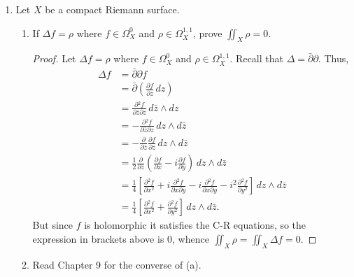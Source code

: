 \documentclass[11pt,oneside,english,reqno]{amsart}
\theoremstyle{definition}
\newcommand{\pp}[2]{\frac{\partial{#1}}{\partial{#2}}}
\begin{document}
\begin{enumerate}[leftmargin=*]
\pagebreak

\item Let $X$ be a compact Riemann surface.
\begin{enumerate}
\itemsep5mm
\item If $\Delta f=\rho$ where $f\in \Omega_X^0$ and $\rho\in\Omega_X^{1,1}$, prove $\displaystyle \iint_X\rho=0$. %

\begin{proof}
Let $\Delta f=\rho$ where $f\in \Omega_X^0$ and $\rho\in\Omega_X^{1,1}$. Recall that $\Delta=\bar\partial\partial$. Thus,
\begin{align*}
\Delta f&=\bar\partial\partial f\\
&=\bar\partial\left(\pp{f}{z}\,dz\right)\\
&=\pp{^2f}{\bar z\partial z}\,d\bar z\wedge dz\\
&=-\pp{^2f}{\bar z\partial z}\,dz\wedge d\bar z\\
&=-\pp{}{\bar z}\pp{f}{z}\,dz\wedge d\bar z\\
&=\frac{1}{2}\pp{}{\bar z}\left(\pp{f}{x}-i\pp{f}{y}\right)\,dz\wedge d\bar z\\
&=\frac{1}{4}\left[\pp{^2f}{x^2}+i\pp{^2f}{x\partial y}-i\pp{^2f}{x\partial y}-i^2\pp{^2f}{y^2}\right]\,dz\wedge d\bar z\\
&=\frac{1}{4}\left[\pp{^2f}{x^2}+\pp{^2f}{y^2}\right]\,dz\wedge d\bar z.
\end{align*}
But since $f$ is holomorphic it satisfies the C-R equations, so the expression in brackets above is 0, whence $\iint_X\rho=\iint_X\Delta f=0$.
\end{proof}

\item Read Chapter 9 for the converse of (a). 
\end{enumerate}




\end{enumerate}
\end{document}
